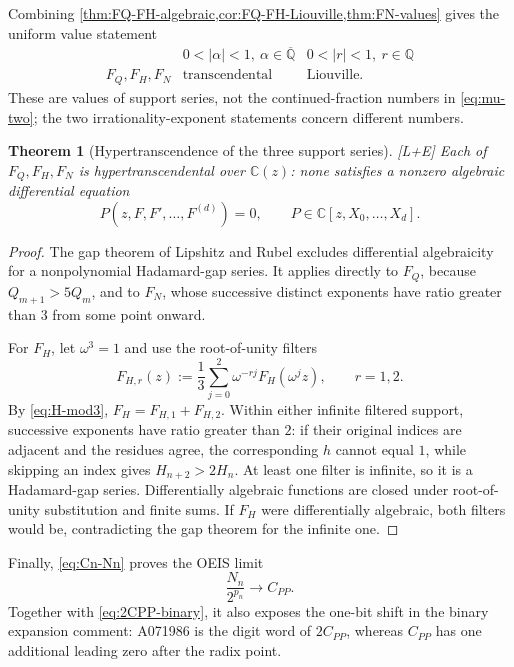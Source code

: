 \documentclass[11pt]{article}
\newtheorem{theorem}{Theorem}[section]
\theoremstyle{definition}
\theoremstyle{remark}
\newcommand{\status}[1]{\textnormal{\textcolor{accent}{\footnotesize[#1]}}}
\begin{document}
Combining \cref{thm:FQ-FH-algebraic,cor:FQ-FH-Liouville,thm:FN-values} gives the
uniform value statement
\begin{equation}\label{eq:three-series-values}
 \begin{array}{c|c|c}
 &0<|\alpha|<1,\ \alpha\in\overline{\mathbb Q}
 &0<|r|<1,\ r\in\mathbb Q\\ \hline
 F_Q,F_H,F_N&\text{transcendental}&\text{Liouville}.
 \end{array}
\end{equation}
These are values of support series, not the continued-fraction numbers in
\eqref{eq:mu-two}; the two irrationality-exponent statements concern different numbers.

\begin{theorem}[Hypertranscendence of the three support series]
\label{thm:three-series-hypertranscendental}
\status{L+E}
Each of $F_Q,F_H,F_N$ is hypertranscendental over $\mathbb C(z)$: none satisfies a
nonzero algebraic differential equation
\[
 P(z,F,F',\ldots,F^{(d)})=0,
 \qquad P\in\mathbb C[z,X_0,\ldots,X_d].
\]
\end{theorem}

\begin{proof}
The gap theorem of Lipshitz and Rubel \cite[Theorem~4.1]{LipshitzRubel} excludes
differential algebraicity for a nonpolynomial Hadamard-gap series.  It applies directly
to $F_Q$, because $Q_{m+1}>5Q_m$, and to $F_N$, whose successive distinct exponents
have ratio greater than $3$ from some point onward.

For $F_H$, let $\omega^3=1$ and use the root-of-unity filters
\[
 F_{H,r}(z):=\frac13\sum_{j=0}^2\omega^{-rj}F_H(\omega^jz),
 \qquad r=1,2.
\]
By \eqref{eq:H-mod3}, $F_H=F_{H,1}+F_{H,2}$.  Within either infinite filtered
support, successive exponents have ratio greater than $2$: if their original indices are
adjacent and the residues agree, the corresponding $h$ cannot equal $1$, while skipping
an index gives $H_{n+2}>2H_n$.  At least one filter is infinite, so it is a
Hadamard-gap series.  Differentially algebraic functions are closed under root-of-unity
substitution and finite sums.  If $F_H$ were differentially algebraic, both filters would
be, contradicting the gap theorem for the infinite one.
\end{proof}

Finally, \eqref{eq:Cn-Nn} proves the OEIS limit
\[
 \frac{N_n}{2^{p_n}}\longrightarrow C_{PP}.
\]
Together with \eqref{eq:2CPP-binary}, it also exposes the one-bit shift in the binary
expansion comment: A071986 is the digit word of $2C_{PP}$, whereas $C_{PP}$ has one
additional leading zero after the radix point.
\end{document}
